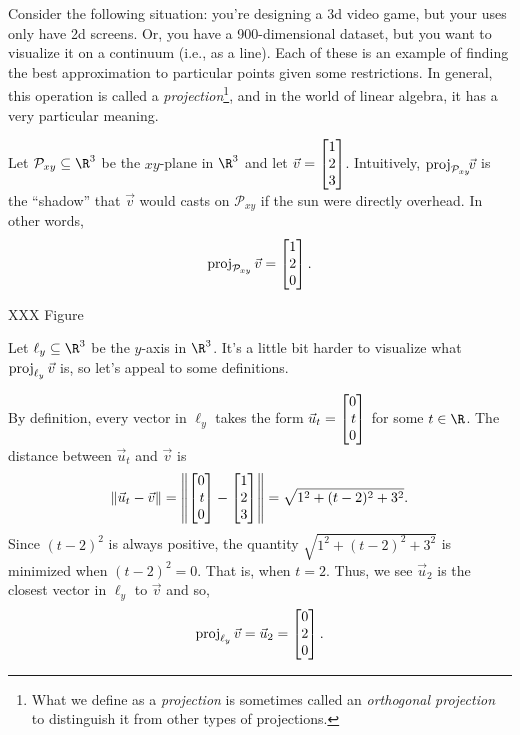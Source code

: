 Consider the following situation: you're designing a 3d video game, but your uses only have 2d screens.
Or, you have a 900-dimensional dataset, but you want to visualize it on a continuum (i.e., as a line). 
Each of these is an example
of finding the best approximation to particular points given some restrictions. In general, this operation
is called a \emph{projection}\footnote{ What we define as a \emph{projection} is sometimes
called an \emph{orthogonal projection} to distinguish it from other types of projections.}, 
and in the world of linear algebra, it has a very particular meaning.


Let $\mathcal P_{xy}\subseteq\R^3$ be the $xy$-plane in $\R^3$ and let $\vec v=\mat{1\\2\\3}$. Intuitively, 
$\operatorname{proj}_{\mathcal P_{xy}}\!\!\vec v$ is the ``shadow'' that  $\vec v$ would casts on ${\mathcal P_{xy}}$ if 
the sun were directly overhead.
In other words,
\[
	\Proj_{\mathcal P_{xy}}\vec v=\mat{1\\2\\0}.
\]

XXX Figure

Let $\ell_y\subseteq \R^3$ be the $y$-axis in $\R^3$. It's a little bit harder to visualize what $\operatorname{proj}_{\ell_y}\vec v$
is, so let's appeal to some definitions.

By definition, every vector in $\ell_y$ takes the form $\vec u_t=\mat{0\\t\\0}$ for some $t\in \R$. The distance
between $\vec u_t$ and $\vec v$ is
\[
	\Norm{\vec u_t-\vec v}=\norm*{\mat{0\\t\\0}-\mat{1\\2\\3}} = \sqrt{1^2+(t-2)^2+3^2}.
\]
Since $(t-2)^2$ is always positive, the quantity $\sqrt{1^2+(t-2)^2+3^2}$ is minimized when $(t-2)^2=0$. That is,
when $t=2$. Thus, we see $\vec u_2$ is the closest vector in $\ell_y$ to $\vec v$ and so,
\[
	\Proj_{\ell_y}\vec v=\vec u_2=\mat{0\\2\\0}.
\]


